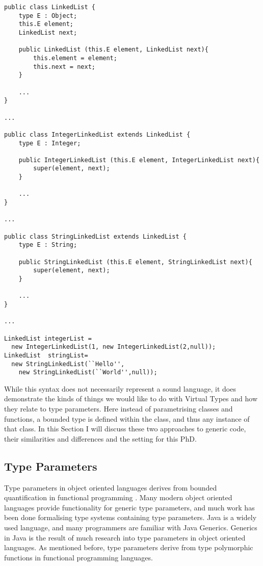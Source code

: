 \documentclass[11pt
              , a4paper
              , twoside
              , openright
              ]{report}
\begin{document}
\begin{lstlisting}[mathescape, style=custom_lang]
public class LinkedList {
	type E : Object;
	this.E element;
	LinkedList next;
	
	public LinkedList (this.E element, LinkedList next){
		this.element = element;
		this.next = next;
	}
	
	...
}

...

public class IntegerLinkedList extends LinkedList {
	type E : Integer;
	
	public IntegerLinkedList (this.E element, IntegerLinkedList next){
		super(element, next);
	}
	
	...
}

...

public class StringLinkedList extends LinkedList {
	type E : String;
	
	public StringLinkedList (this.E element, StringLinkedList next){
		super(element, next);
	}
	
	...
}

...

LinkedList integerList = 
  new IntegerLinkedList(1, new IntegerLinkedList(2,null));
LinkedList  stringList= 
  new StringLinkedList(``Hello'', 
    new StringLinkedList(``World'',null));
\end{lstlisting}
While this syntax does not necessarily represent a sound language, it does demonstrate the kinds of things we would like to do with Virtual Types and how they relate to type parameters. Here instead of parametrising classes and functions, a bounded type is defined within the class, and thus any instance of that class.
In this Section I will discuss these two approaches to generic code, their similarities and differences and the setting for this PhD. 


\subsection{Type Parameters}
Type parameters in object oriented languages derives from bounded quantification in functional programming \cite{Cardelli 86, Odersky 89, System F}. Many modern object oriented languages provide functionality for generic type parameters, and much work has been done formalising type systems containing type parameters. Java is a widely used language, and many programmers are familiar with Java Generics. Generics in Java is the result of much research into type parameters in object oriented languages. As mentioned before, type parameters derive from type polymorphic functions in functional programming languages.
\end{document}
